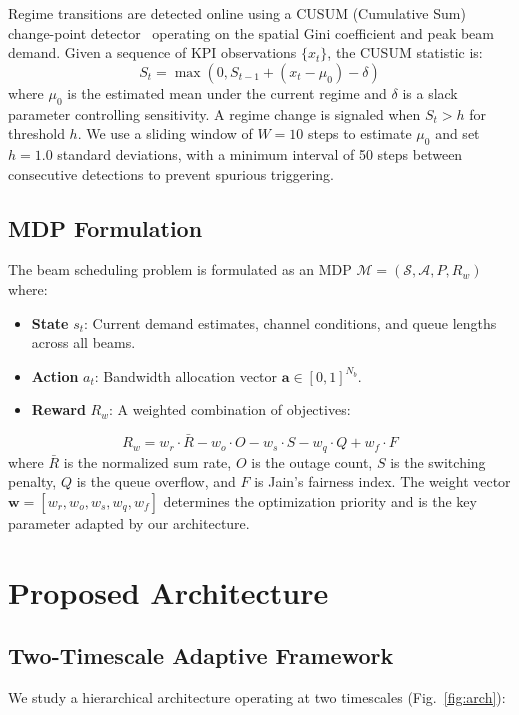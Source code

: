 \documentclass[conference]{IEEEtran}
\begin{document}
Regime transitions are detected online using a CUSUM (Cumulative Sum) change-point detector~\cite{cusum} operating on the spatial Gini coefficient and peak beam demand. Given a sequence of KPI observations $\{x_t\}$, the CUSUM statistic is:
\begin{equation}
S_t = \max\left(0, S_{t-1} + (x_t - \mu_0) - \delta\right)
\end{equation}
where $\mu_0$ is the estimated mean under the current regime and $\delta$ is a slack parameter controlling sensitivity. A regime change is signaled when $S_t > h$ for threshold $h$. We use a sliding window of $W = 10$ steps to estimate $\mu_0$ and set $h = 1.0$ standard deviations, with a minimum interval of 50 steps between consecutive detections to prevent spurious triggering.

\subsection{MDP Formulation}
The beam scheduling problem is formulated as an MDP $\mathcal{M} = (\mathcal{S}, \mathcal{A}, P, R_w)$ where:
\begin{itemize}
\item \textbf{State} $s_t$: Current demand estimates, channel conditions, and queue lengths across all beams.
\item \textbf{Action} $a_t$: Bandwidth allocation vector $\mathbf{a} \in [0,1]^{N_b}$.
\item \textbf{Reward} $R_w$: A weighted combination of objectives:
\end{itemize}
\begin{equation}
R_w = w_r \cdot \bar{R} - w_o \cdot O - w_s \cdot S - w_q \cdot Q + w_f \cdot F
\label{eq:reward}
\end{equation}
where $\bar{R}$ is the normalized sum rate, $O$ is the outage count, $S$ is the switching penalty, $Q$ is the queue overflow, and $F$ is Jain's fairness index. The weight vector $\mathbf{w} = [w_r, w_o, w_s, w_q, w_f]$ determines the optimization priority and is the key parameter adapted by our architecture.

\section{Proposed Architecture}

\subsection{Two-Timescale Adaptive Framework}
We study a hierarchical architecture operating at two timescales (Fig.~\ref{fig:arch}):
\end{document}
